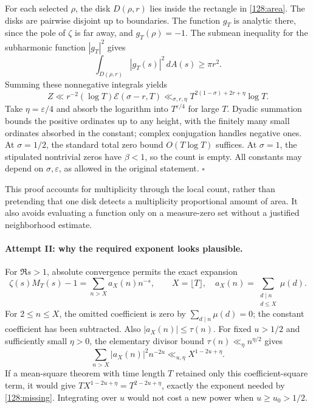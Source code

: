 \documentclass[11pt,a4paper]{article}
\numberwithin{equation}{section}
\begin{document}
For each selected $\rho$, the disk $D(\rho,r)$ lies inside the rectangle
in \eqref{128:area}.  The disks are pairwise disjoint up to boundaries.
The function $g_T$ is analytic there, since the pole of $\zeta$ is far
away, and $g_T(\rho)=-1$.  The submean inequality for the subharmonic
function $|g_T|^2$ gives
\[
 \int_{D(\rho,r)}|g_T(s)|^2\,dA(s)\geq\pi r^2.
\]
Summing these nonnegative integrals yields
\begin{equation}\label{128:detection}
 Z\ll r^{-2}(\log T)\mathcal E(\sigma-r,T)
   \ll_{\sigma,r,\eta}T^{2(1-\sigma)+2r+\eta}\log T.
\end{equation}
Take $\eta=\varepsilon/4$ and absorb the logarithm into
$T^{\varepsilon/4}$ for large $T$.  Dyadic summation bounds the positive
ordinates up to any height, with the finitely many small ordinates
absorbed in the constant; complex conjugation handles negative ones.
At $\sigma=1/2$, the standard total zero bound $O(T\log T)$ suffices.
At $\sigma=1$, the stipulated nontrivial zeros have $\beta<1$, so the
count is empty.  All constants may depend on $\sigma,\varepsilon$, as
allowed in the original statement. \hfill$\square$

This proof accounts for multiplicity through the local count, rather
than pretending that one disk detects a multiplicity proportional
amount of area.  It also avoids evaluating a function only on a
measure-zero set without a justified neighborhood estimate.

\paragraph{Attempt II: why the required exponent looks plausible.}
For $\Re s>1$, absolute convergence permits the exact expansion
\begin{equation}\label{128:coefficients}
 \zeta(s)M_T(s)-1=\sum_{n>X}a_X(n)n^{-s},\qquad
 X=\lfloor T\rfloor,\quad
 a_X(n)=\sum_{\substack{d\mid n\\d\leq X}}\mu(d).
\end{equation}
For $2\leq n\leq X$, the omitted coefficient is zero by
$\sum_{d\mid n}\mu(d)=0$; the constant coefficient has been subtracted.
Also $|a_X(n)|\leq\tau(n)$.  For fixed $u>1/2$ and sufficiently small
$\eta>0$, the elementary divisor bound $\tau(n)\ll_\eta n^{\eta/2}$ gives
\begin{equation}\label{128:diagonal}
 \sum_{n>X}|a_X(n)|^2n^{-2u}
 \ll_{u,\eta}X^{1-2u+\eta}.
\end{equation}
If a mean-square theorem with time length $T$ retained only this
coefficient-square term, it would give
$T X^{1-2u+\eta}=T^{2-2u+\eta}$, exactly the exponent needed by
\eqref{128:missing}.  Integrating over $u$ would not cost a new power
when $u\geq u_0>1/2$.
\end{document}

